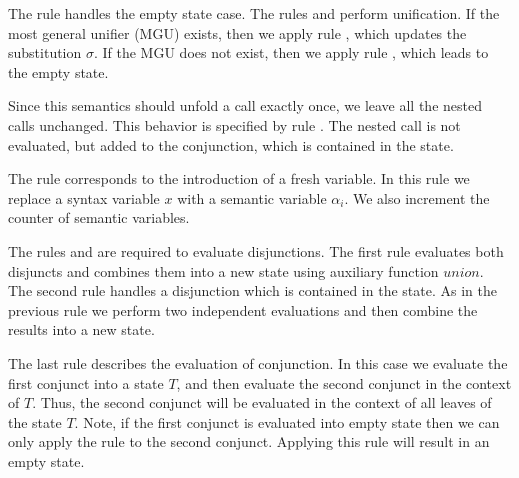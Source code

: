 The rule  handles the empty state case. The rules  and  perform unification. If the most general unifier (MGU) exists, then we apply rule ,
which updates the substitution $\sigma$. If the MGU does not exist, then we apply rule , which leads to the empty state.

Since this semantics should unfold a call exactly once, we leave all the nested calls unchanged. This behavior is specified by rule . The nested call is not evaluated, but added to the conjunction, which is contained in the state.

The rule  corresponds to the introduction of a fresh variable. In this rule we replace a syntax variable $x$ with a semantic variable $\alpha_i$. We also increment the counter of semantic variables.

The rules  and  are required to evaluate disjunctions. The first rule evaluates both disjuncts and combines them into a new state using auxiliary
function $union$. The second rule handles a disjunction which is contained in the state. As in the previous rule we perform two independent evaluations and then combine the results into a new state.

The last rule  describes the evaluation of conjunction. In this case we evaluate the first conjunct into a state $T$, and then evaluate the second conjunct in the context of $T$. Thus, the second conjunct will be evaluated in the context of all leaves of the state $T$. Note, if the first conjunct is evaluated into empty state then we can only apply the rule  to the second conjunct. Applying this rule will result in an empty state.

